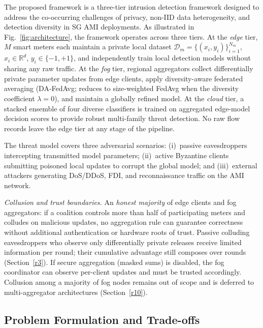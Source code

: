 \documentclass[sensors,article,submit,pdftex,moreauthors]{Definitions/mdpi}
\begin{document}
The proposed framework is a three-tier intrusion detection framework designed to address the co-occurring challenges of privacy, non-IID data heterogeneity, and detection diversity in SG AMI deployments. As illustrated in Fig.~\ref{fig:architecture}, the framework operates across three tiers. At the \textit{edge} tier, $M$ smart meters each maintain a private local dataset $\mathcal{D}_m = \{(x_i, y_i)\}_{i=1}^{N_m}$, $x_i \in \mathbb{R}^d$, $y_i \in \{-1,+1\}$, and independently train local detection models without sharing any raw traffic. At the \textit{fog} tier, regional aggregators collect differentially private parameter updates from edge clients, apply diversity-aware federated averaging (DA-FedAvg; reduces to size-weighted FedAvg when the diversity coefficient $\lambda{=}0$), and maintain a globally refined model. At the \textit{cloud} tier, a stacked ensemble of four diverse classifiers is trained on aggregated edge-model decision scores to provide robust multi-family threat detection. No raw flow records leave the edge tier at any stage of the pipeline.

The threat model covers three adversarial scenarios: (i)~passive eavesdroppers intercepting transmitted model parameters; (ii)~active Byzantine clients submitting poisoned local updates to corrupt the global model; and (iii)~external attackers generating DoS/DDoS, FDI, and reconnaissance traffic on the AMI network.

\noindent\textit{Collusion and trust boundaries.} An \textit{honest majority} of edge clients and fog aggregators: if a coalition controls more than half of participating meters and colludes on malicious updates, no aggregation rule can guarantee correctness without additional authentication or hardware roots of trust. Passive colluding eavesdroppers who observe only differentially private releases receive limited information per round; their cumulative advantage still composes over rounds (Section~\ref{r3}). If secure aggregation (masked sums) is disabled, the fog coordinator can observe per-client updates and must be trusted accordingly. Collusion among a majority of fog nodes remains out of scope and is deferred to multi-aggregator architectures (Section~\ref{r10}).

\subsection{Problem Formulation and Trade-offs}\label{sec:problem_formulation}
\end{document}

